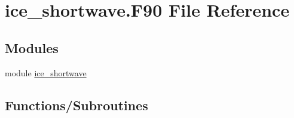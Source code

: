 \hypertarget{ice__shortwave_8F90}{
\section{ice\_\-shortwave.F90 File Reference}
\label{ice__shortwave_8F90}
}
\subsection*{Modules}
\begin{DoxyCompactItemize}
\item 
module \hyperlink{namespaceice__shortwave}{ice\_\-shortwave}
\end{DoxyCompactItemize}
\subsection*{Functions/Subroutines}
